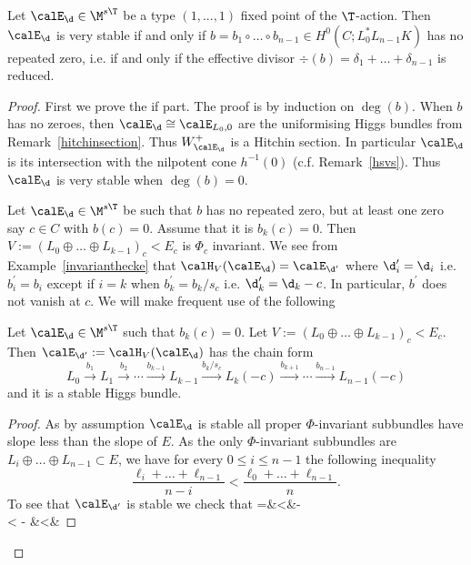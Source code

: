 \begin{theorem}
\notready \label{mainverystable} Let $\calE_{\d} \in \M^{s\T}$ be a type $(1,...,1)$ fixed point of the $\T$-action. Then $\calE_{\d}$ is very stable if and only if $b=b_1\circ\dots \circ b_{n-1}\in H^0(C;L_0^*L_{n-1}K)$ has no repeated zero, i.e. if and only if the effective divisor $\div(b)=\delta_1+\dots+\delta_{n-1}$ is reduced.
\end{theorem}
\begin{proof} First we prove the if part. The proof is by induction on $\deg(b)$. When $b$ has no zeroes, then $\calE_{\d}\cong \calE_{L_0,0}$ are the uniformising Higgs bundles from Remark~\ref{hitchinsection}. Thus $W^+_{\calE_{\d}}$ is a Hitchin section. In particular $\calE_{\d}$ is its intersection with the nilpotent cone $h^{-1}(0)$ (c.f. Remark~\ref{hsvs}). Thus $\calE_{\d}$ is very stable when $\deg(b)=0$.

	Let $\calE_{\d} \in \M^{s\T}$ be such that $b$ has no repeated zero, but at least one zero say $c\in C$ with $b(c)=0$. Assume that it is $b_k(c)=0$. Then $V:=(L_0\oplus \dots \oplus L_{k-1})_c<E_c$ is $\Phi_c$ invariant. We see from Example~\ref{invarianthecke} that $\calH_{V}(\calE_{\d})=\calE_{\d^\prime}$ where $\d^\prime_i=\d_i$ i.e. $b^\prime_i=b_i$ except if  $i=k$ when  $b^\prime_k=b_k/s_c$ i.e. $\d^\prime_k=\d_k-c$. In particular, $b^\prime$ does not vanish at $c$. We will make frequent use of the following
	\begin{lemma}
\notready\label{stablemma} Let $\calE_{\d} \in \M^{s\T}$ such that $b_k(c)=0$. Let $V:=(L_0\oplus \dots \oplus L_{k-1})_c<E_c$. Then  $\calE_{\d^\prime}:=\calH_{V}(\calE_{\d})$ has the chain form
$$L_0\stackrel{b_1}{\rightarrow}{L_1}\stackrel{b_2}{\rightarrow}\cdots \stackrel{b_{k-1}}{\rightarrow}L_{k-1} \stackrel{b_k/s_c}{\rightarrow} L_k(-c)\stackrel{b_{k+1}}{\rightarrow}\cdots \stackrel{b_{n-1}}{\rightarrow}{L_{n-1}(-c)}$$ and it is a stable Higgs bundle.
	\end{lemma}
	\begin{proof} As by assumption $\calE_{\d}$ is stable all proper $\Phi$-invariant subbundles have slope less than the slope of $E$. As the  only $\Phi$-invariant subbundles are $L_i\oplus \dots \oplus L_{n-1}\subset E$, we have for every $0\leq i \leq n-1$ the following inequality  $$\frac{\ell_i+\dots+\ell_{n-1}}{n-i}<\frac{\ell_0+\dots+\ell_{n-1}}{n}.$$ To see that $\calE_{\d^\prime}$ is stable we check that \bes {}=&<&-\\
		< -
		&<&  \ees


\end{proof}
\end{proof}
